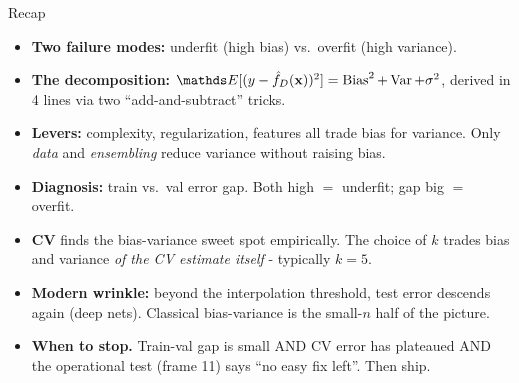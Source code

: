 \documentclass[aspectratio=169]{beamer}
\newcommand{\Var}{\operatorname{Var}}
\newcommand{\Bias}{\operatorname{Bias}}
\newcommand{\fDx}{\hat{f}_D(\xv)}
\begin{document}
\begin{frame}{Recap}
  \begin{itemize}\small
    \item \textbf{Two failure modes:} underfit (high bias) vs.\ overfit (high variance).
    \item \textbf{The decomposition:} $\E[(y - \fDx)^2] = \Bias^2 + \Var + \sigma^2$, derived in 4 lines via two ``add-and-subtract'' tricks.
    \item \textbf{Levers:} complexity, regularization, features all trade bias for variance. Only \emph{data} and \emph{ensembling} reduce variance without raising bias.
    \item \textbf{Diagnosis:} train vs.\ val error gap. Both high $=$ underfit; gap big $=$ overfit.
    \item \textbf{CV} finds the bias-variance sweet spot empirically. The choice of $k$ trades bias and variance \emph{of the CV estimate itself} - typically $k = 5$.
    \item \textbf{Modern wrinkle:} beyond the interpolation threshold, test error descends again (deep nets). Classical bias-variance is the small-$n$ half of the picture.
    \item \textbf{When to stop.} Train-val gap is small AND CV error has plateaued AND the operational test (frame 11) says ``no easy fix left''. Then ship.
  \end{itemize}
\end{frame}
\end{document}

